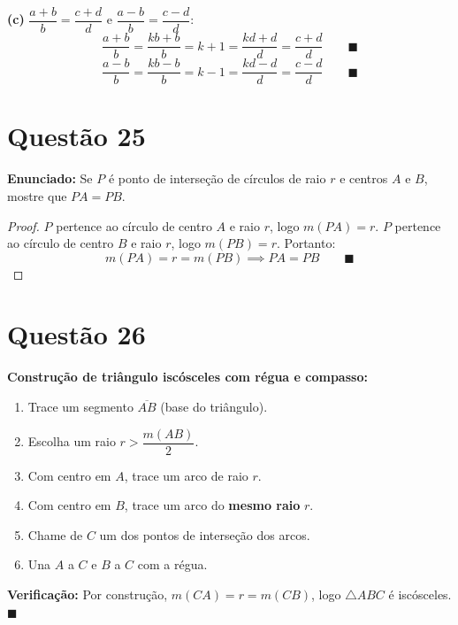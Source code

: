 \documentclass[12pt,a4paper]{article}
\begin{document}
\textbf{(c)} $\dfrac{a+b}{b} = \dfrac{c+d}{d}$ e $\dfrac{a-b}{b} = \dfrac{c-d}{d}$:
$$\frac{a+b}{b} = \frac{kb+b}{b} = k+1 = \frac{kd+d}{d} = \frac{c+d}{d} \qquad \blacksquare$$
$$\frac{a-b}{b} = \frac{kb-b}{b} = k-1 = \frac{kd-d}{d} = \frac{c-d}{d} \qquad \blacksquare$$

\section*{Quest\~ao 25}

\textbf{Enunciado:} Se $P$ \'e ponto de interse\c{c}\~ao de c\'irculos de raio $r$ e centros $A$ e $B$, mostre que $PA = PB$.

\begin{proof}
$P$ pertence ao c\'irculo de centro $A$ e raio $r$, logo $m(PA) = r$. $P$ pertence ao c\'irculo de centro $B$ e raio $r$, logo $m(PB) = r$. Portanto:
$$m(PA) = r = m(PB) \implies PA = PB \qquad \blacksquare$$
\end{proof}

\section*{Quest\~ao 26}

\textbf{Constru\c{c}\~ao de tri\^angulo isc\'osceles com r\'egua e compasso:}

\begin{enumerate}
\item Trace um segmento $\overline{AB}$ (base do tri\^angulo).
\item Escolha um raio $r > \dfrac{m(AB)}{2}$.
\item Com centro em $A$, trace um arco de raio $r$.
\item Com centro em $B$, trace um arco do \textbf{mesmo raio} $r$.
\item Chame de $C$ um dos pontos de interse\c{c}\~ao dos arcos.
\item Una $A$ a $C$ e $B$ a $C$ com a r\'egua.
\end{enumerate}

\textbf{Verifica\c{c}\~ao:} Por constru\c{c}\~ao, $m(CA) = r = m(CB)$, logo $\triangle ABC$ \'e isc\'osceles. $\blacksquare$
\end{document}
